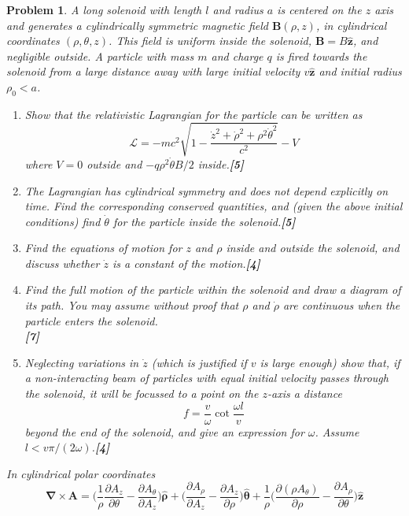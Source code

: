 \documentclass[a4paper]{article}
\theoremstyle{new}
\newtheorem{qns}{Problem}[section]
\begin{document}
\begin{qns}
A long solenoid with length $l$ and radius $a$ is centered on the $z$ axis and generates a cylindrically symmetric magnetic field $\mathbf{B}(\rho, z)$, in cylindrical coordinates $(\rho, \theta, z)$. This field is uniform inside the solenoid, $\mathbf{B}=B\mathbf{\hat{z}}$, and negligible outside. A particle with mass $m$ and charge $q$ is fired towards the solenoid from a large distance away with large initial velocity $v\mathbf{\hat{z}}$ and initial radius $\rho_0<a$.
\begin{enumerate}[label=(\alph*)]
\item Show that the relativistic Lagrangian for the particle can be written as
$$\mathcal{L}=-mc^2\sqrt{1-\frac{\dot{z}^2+\dot{\rho}^2+\rho^2\dot{\theta}^2}{c^2}}-V$$
where $V=0$ outside and $-q\rho^2\dot{\theta}B/2$ inside.\hfill\textbf{[5]}
\item The Lagrangian has cylindrical symmetry and does not depend explicitly on time. Find the corresponding conserved quantities, and (given the above initial conditions) find $\dot{\theta}$ for the particle inside the solenoid.\hfill\textbf{[5]}
\item Find the equations of motion for $z$ and $\rho$ inside and outside the solenoid, and discuss whether $\dot{z}$ is a constant of the motion.\hfill\textbf{[4]}
\item Find the full motion of the particle within the solenoid and draw a
diagram of its path. You may assume without proof that $\rho$ and $\dot{\rho}$ are continuous when the particle enters the solenoid.\\

\hfill\textbf{[7]}
\item Neglecting variations in $\dot{z}$ (which is justified if $v$ is large enough) show that, if a non-interacting beam of particles with equal initial velocity passes through the solenoid, it will be focussed to a point on the $z$-axis a distance
$$f=\frac{v}{\omega}\cot\frac{\omega l}{v}$$
beyond the end of the solenoid, and give an expression for $\omega$. Assume $l < v\pi/(2\omega)$.\hfill\textbf{[4]}
\end{enumerate}
In cylindrical polar coordinates
$$\boldsymbol{\nabla}\times\mathbf{A}=\bigg(\frac{1}{\rho}\frac{\partial A_z}{\partial\theta}-\frac{\partial A_\theta}{\partial A_z}\bigg)\boldsymbol{\hat{\rho}}+\bigg(\frac{\partial A_\rho}{\partial A_z}-\frac{\partial A_z}{\partial\rho}\bigg)\boldsymbol{\hat{\theta}}+\frac{1}{\rho}\bigg(\frac{\partial(\rho A_\theta)}{\partial\rho}-\frac{\partial A_\rho}{\partial\theta}\bigg)\mathbf{\hat{z}}$$
\end{qns}
\end{document}

